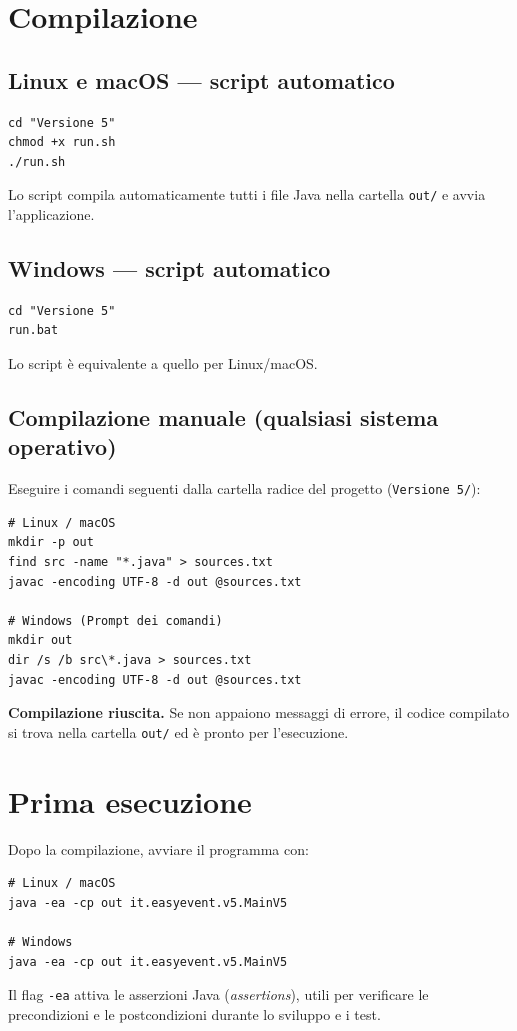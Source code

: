 \documentclass[12pt,a4paper,oneside]{report}
\newcommand{\cmd}[1]{\texttt{\small#1}}
\newcommand{\file}[1]{\texttt{\small#1}}
\begin{document}
\section{Compilazione}

\subsection{Linux e macOS — script automatico}
\begin{lstlisting}[style=bash]
cd "Versione 5"
chmod +x run.sh
./run.sh
\end{lstlisting}
Lo script compila automaticamente tutti i file Java nella cartella \file{out/} e avvia l'applicazione.

\subsection{Windows — script automatico}
\begin{lstlisting}
cd "Versione 5"
run.bat
\end{lstlisting}
Lo script è equivalente a quello per Linux/macOS.

\subsection{Compilazione manuale (qualsiasi sistema operativo)}
Eseguire i comandi seguenti dalla cartella radice del progetto (\file{Versione 5/}):
\begin{lstlisting}[style=bash]
# Linux / macOS
mkdir -p out
find src -name "*.java" > sources.txt
javac -encoding UTF-8 -d out @sources.txt

# Windows (Prompt dei comandi)
mkdir out
dir /s /b src\*.java > sources.txt
javac -encoding UTF-8 -d out @sources.txt
\end{lstlisting}

\begin{successobox}
\textbf{Compilazione riuscita.} Se non appaiono messaggi di errore, il codice compilato si trova nella cartella \file{out/} ed è pronto per l'esecuzione.
\end{successobox}

\section{Prima esecuzione}
Dopo la compilazione, avviare il programma con:
\begin{lstlisting}[style=bash]
# Linux / macOS
java -ea -cp out it.easyevent.v5.MainV5

# Windows
java -ea -cp out it.easyevent.v5.MainV5
\end{lstlisting}
Il flag \cmd{-ea} attiva le asserzioni Java (\textit{assertions}), utili per verificare le precondizioni e le postcondizioni durante lo sviluppo e i test.
\end{document}
